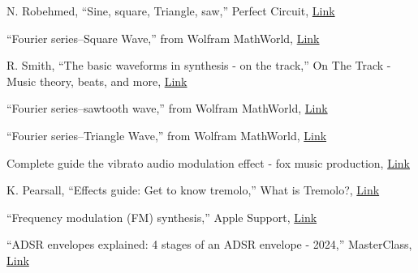 \documentclass[12pt]{article}
\begin{document}
\begin{thebibliography}{99}
 N. Robehmed, “Sine, square, Triangle, saw,” Perfect Circuit, \href{https://www.perfectcircuit.com/signal/difference-between-waveforms?srsltid=AfmBOoqnJ4EZmI1aorjWtuXuEAHn448bQlZGz2gpxDJSVu2E_FpVeH2Y}{Link}

 “Fourier series--Square Wave,” from Wolfram MathWorld, \href{https://mathworld.wolfram.com/FourierSeriesSquareWave.html}{Link}

 R. Smith, “The basic waveforms in synthesis - on the track,” On The Track - Music theory, beats, and more, \href{https://onthetrackofficial.com/the-basic-waveforms-in-synthesis/}{Link}

 “Fourier series--sawtooth wave,” from Wolfram MathWorld, \href{https://mathworld.wolfram.com/FourierSeriesSawtoothWave.html}{Link}

 “Fourier series--Triangle Wave,” from Wolfram MathWorld, \href{https://mathworld.wolfram.com/FourierSeriesTriangleWave.html}{Link} 

 Complete guide the vibrato audio modulation effect - fox music production, \href{https://foxmusicproduction.com/vibrato-audio-modulation-effect/}{Link}

 K. Pearsall, “Effects guide: Get to know tremolo,” What is Tremolo?, \href{https://www.fender.com/articles/parts-and-accessories/pedal-board-primer-get-to-know-tremolo#:~:text=Tremolo%20is%20a%20modulation%20effect%20that%20rhythmically%20changes%20the%20volume,the%20signal%20up%20and%20down.}{Link}

 “Frequency modulation (FM) synthesis,” Apple Support, \href{https://support.apple.com/en-ca/guide/logicpro/lgsife418213/mac#:~:text=FM%20synthesis%20is%20extremely%20good,bass%20and%20synthetic%20brass%20sounds.}{Link}

 “ADSR envelopes explained: 4 stages of an ADSR envelope - 2024,” MasterClass, \href{https://www.masterclass.com/articles/adsr-envelope-explained#4bPVgIZ4W9GAOAyN3yNHDN}{Link} 

\end{thebibliography}
\end{document}
